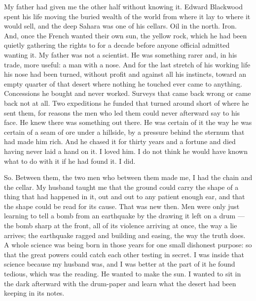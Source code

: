 My father had given me the other half without knowing it. Edward Blackwood spent his life moving the buried wealth of the world from where it lay to where it would sell, and the deep Sahara was one of his cellars. Oil in the north. Iron. And, once the French wanted their own sun, the yellow rock, which he had been quietly gathering the rights to for a decade before anyone official admitted wanting it. My father was not a scientist. He was something rarer and, in his trade, more useful: a man with a nose. And for the last stretch of his working life his nose had been turned, without profit and against all his instincts, toward an empty quarter of that desert where nothing he touched ever came to anything. Concessions he bought and never worked. Surveys that came back wrong or came back not at all. Two expeditions he funded that turned around short of where he sent them, for reasons the men who led them could never afterward say to his face. He knew there was something out there. He was certain of it the way he was certain of a seam of ore under a hillside, by a pressure behind the sternum that had made him rich. And he chased it for thirty years and a fortune and died having never laid a hand on it. I loved him. I do not think he would have known what to do with it if he had found it. I did.\par

So. Between them, the two men who between them made me, I had the chain and the cellar. My husband taught me that the ground could carry the shape of a thing that had happened in it, out and out to any patient enough ear, and that the shape could be read for its cause. That was new then. Men were only just learning to tell a bomb from an earthquake by the drawing it left on a drum --- the bomb sharp at the front, all of its violence arriving at once, the way a lie arrives; the earthquake ragged and building and easing, the way the truth does. A whole science was being born in those years for one small dishonest purpose: so that the great powers could catch each other testing in secret. I was inside that science because my husband was, and I was better at the part of it he found tedious, which was the reading. He wanted to make the sun. I wanted to sit in the dark afterward with the drum-paper and learn what the desert had been keeping in its notes.\par

